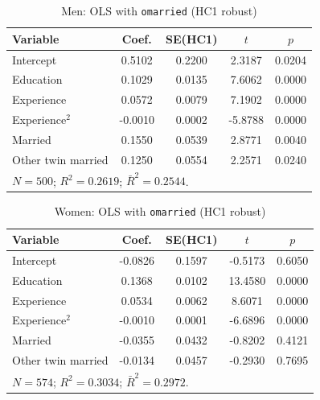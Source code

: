 \documentclass[12pt]{article}
\begin{document}
\begin{table}[htbp]
  \centering
  \caption{Men: OLS with \texttt{omarried} (HC1 robust)}
  \label{tab:q3c_men}
  \small
  \begin{tabular}{l
                  S[table-format=1.4]
                  S[table-format=1.4]
                  S[table-format=2.4]
                  S[table-format=1.4]}
    \toprule
    Variable & {Coef.} & {SE(HC1)} & {$t$} & {$p$} \\
    \midrule
    Intercept        & 0.5102 & 0.2200 &  2.3187 & 0.0204 \\
    Education        & 0.1029 & 0.0135 &  7.6062 & 0.0000 \\
    Experience       & 0.0572 & 0.0079 &  7.1902 & 0.0000 \\
    Experience$^{2}$ & -0.0010& 0.0002 & -5.8788 & 0.0000 \\
    Married          & 0.1550 & 0.0539 &  2.8771 & 0.0040 \\
    Other twin married & 0.1250 & 0.0554 &  2.2571 & 0.0240 \\
    \midrule
     \\
    \bottomrule
  \end{tabular}
\end{table}

\begin{table}[htbp]
  \centering
  \caption{Women: OLS with \texttt{omarried} (HC1 robust)}
  \label{tab:q3c_women}
  \small
  \begin{tabular}{l
                  S[table-format=1.4]
                  S[table-format=1.4]
                  S[table-format=2.4]
                  S[table-format=1.4]}
    \toprule
    Variable & {Coef.} & {SE(HC1)} & {$t$} & {$p$} \\
    \midrule
    Intercept        & -0.0826 & 0.1597 & -0.5173 & 0.6050 \\
    Education        & 0.1368  & 0.0102 & 13.4580 & 0.0000 \\
    Experience       & 0.0534  & 0.0062 &  8.6071 & 0.0000 \\
    Experience$^{2}$ & -0.0010 & 0.0001 & -6.6896 & 0.0000 \\
    Married          & -0.0355 & 0.0432 & -0.8202 & 0.4121 \\
    Other twin married & -0.0134 & 0.0457 & -0.2930 & 0.7695 \\
    \midrule
     \\
    \bottomrule
  \end{tabular}
\end{table}
\end{document}
